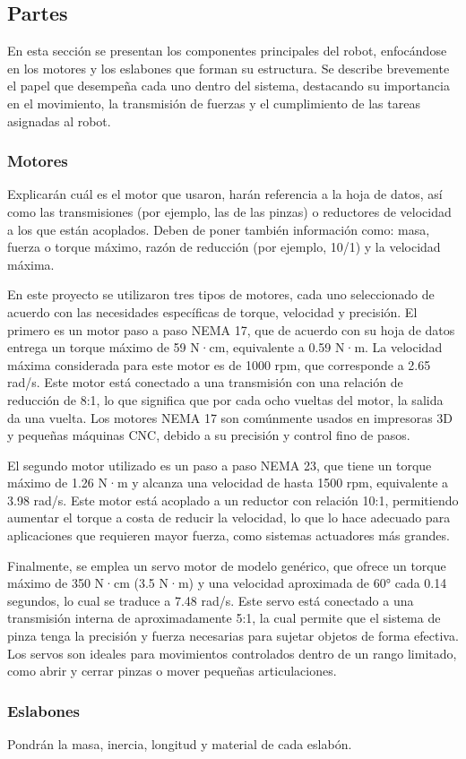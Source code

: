 \subsection{Partes} \label{subsec:partes}
En esta sección se presentan los componentes principales del robot, enfocándose en los motores y los eslabones que forman su estructura. Se describe brevemente el papel que desempeña cada uno dentro del sistema, destacando su importancia en el movimiento, la transmisión de fuerzas y el cumplimiento de las tareas asignadas al robot.


\subsubsection{Motores} \label{subsubsec:motores}
Explicarán cuál es el motor que usaron, harán referencia a la hoja de datos, así como las transmisiones (por ejemplo, las de las pinzas) o reductores de velocidad a los que están acoplados. Deben de poner también información como: masa, fuerza o torque máximo, razón de reducción (por ejemplo, 10/1) y la velocidad máxima.

En este proyecto se utilizaron tres tipos de motores, cada uno seleccionado de acuerdo con las necesidades específicas de torque, velocidad y precisión. El primero es un motor paso a paso NEMA 17, que de acuerdo con su hoja de datos entrega un torque máximo de 59 N·cm, equivalente a 0.59 N·m. La velocidad máxima considerada para este motor es de 1000 rpm, que corresponde a 2.65 rad/s. Este motor está conectado a una transmisión con una relación de reducción de 8:1, lo que significa que por cada ocho vueltas del motor, la salida da una vuelta. Los motores NEMA 17 son comúnmente usados en impresoras 3D y pequeñas máquinas CNC, debido a su precisión y control fino de pasos.

El segundo motor utilizado es un paso a paso NEMA 23, que tiene un torque máximo de 1.26 N·m y alcanza una velocidad de hasta 1500 rpm, equivalente a 3.98 rad/s. Este motor está acoplado a un reductor con relación 10:1, permitiendo aumentar el torque a costa de reducir la velocidad, lo que lo hace adecuado para aplicaciones que requieren mayor fuerza, como sistemas actuadores más grandes.

Finalmente, se emplea un servo motor de modelo genérico, que ofrece un torque máximo de 350 N·cm (3.5 N·m) y una velocidad aproximada de 60° cada 0.14 segundos, lo cual se traduce a 7.48 rad/s. Este servo está conectado a una transmisión interna de aproximadamente 5:1, la cual permite que el sistema de pinza tenga la precisión y fuerza necesarias para sujetar objetos de forma efectiva. Los servos son ideales para movimientos controlados dentro de un rango limitado, como abrir y cerrar pinzas o mover pequeñas articulaciones.


\subsubsection{Eslabones} \label{subsubsec:eslabones}
Pondrán la masa, inercia, longitud y material de cada eslabón.